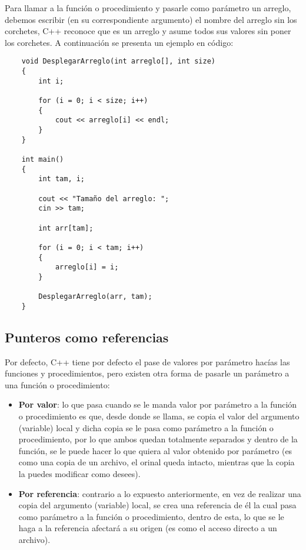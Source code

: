 Para llamar a la función o procedimiento y pasarle como parámetro un arreglo, debemos escribir (en su correspondiente argumento) el nombre del arreglo sin los corchetes, C++ reconoce que es un arreglo y asume todos sus valores sin poner los corchetes. A continuación se presenta un ejemplo en código:
\begin{lstlisting}
    void DesplegarArreglo(int arreglo[], int size)
    {
        int i;
        
        for (i = 0; i < size; i++)
        {
            cout << arreglo[i] << endl;
        }
    }
    
    int main()
    {
        int tam, i;
        
        cout << "Tamaño del arreglo: ";
        cin >> tam;
        
        int arr[tam];
        
        for (i = 0; i < tam; i++)
        {
            arreglo[i] = i;
        }
        
        DesplegarArreglo(arr, tam);
    }
\end{lstlisting}


\subsection{Punteros como referencias}
\hspace{0.55cm}Por defecto, C++ tiene por defecto el pase de valores por parámetro hacías las funciones y procedimientos, pero existen otra forma de pasarle un parámetro a una función o procedimiento:
\begin{itemize}
    \item \textbf{Por valor}: lo que pasa cuando se le manda valor por parámetro a la función o procedimiento es que, desde donde se llama, se copia el valor del argumento (variable) local y dicha copia se le pasa como parámetro a la función o procedimiento, por lo que ambos quedan totalmente separados y dentro de la función, se le puede hacer lo que quiera al valor obtenido por parámetro (es como una copia de un archivo, el orinal queda intacto, mientras que la copia la puedes modificar como desees).
    \item \textbf{Por referencia}: contrario a lo expuesto anteriormente, en vez de realizar una copia del argumento (variable) local, se crea una referencia de él la cual pasa como parámetro a la función o procedimiento, dentro de esta, lo que se le haga a la referencia afectará a su origen (es como el acceso directo a un archivo).
\end{itemize}

